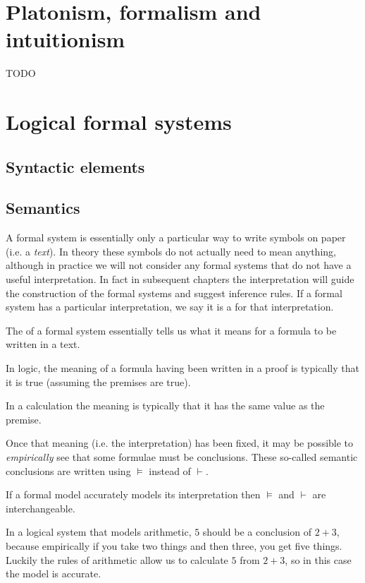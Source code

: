 \section{Platonism, formalism and intuitionism}
TODO

\section{Logical formal systems}
\subsection{Syntactic elements}
\subsection{Semantics}
A formal system is essentially only a particular way to write symbols on paper (i.e. a \textit{text}). In theory these symbols do not actually need to mean anything, although in practice we will not consider any formal systems that do not have a useful interpretation. In fact in subsequent chapters the interpretation will guide the construction of the formal systems and suggest inference rules. If a formal system has a particular interpretation, we say it is a  for that interpretation.

The  of a formal system essentially tells us what it means for a formula to be written in a text.

\begin{example}
In logic, the meaning of a formula having been written in a proof is typically that it is true (assuming the premises are true).

In a calculation the meaning is typically that it has the same value as the premise.
\end{example}

Once that meaning (i.e. the interpretation) has been fixed, it may be possible to \textit{empirically} see that some formulae must be conclusions. These so-called semantic conclusions are written using $\models$ instead of $\vdash$.

If a formal model accurately models its interpretation then $\models$ and $\vdash$ are interchangeable.

\begin{example}
In a logical system that models arithmetic, $5$ should be a conclusion of $2+3$, because empirically if you take two things and then three, you get five things. Luckily the rules of arithmetic allow us to calculate $5$ from $2+3$, so in this case the model is accurate.
\end{example}


